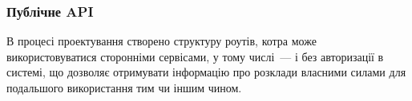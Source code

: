 \subsubsection{Публічне API}

В процесі проектування створено структуру роутів, котра може використовуватися сторонніми сервісами, у тому числі~--- і без авторизації в системі, що дозволяє отримувати інформацію про розклади власними силами для подальшого використання тим чи іншим чином. 